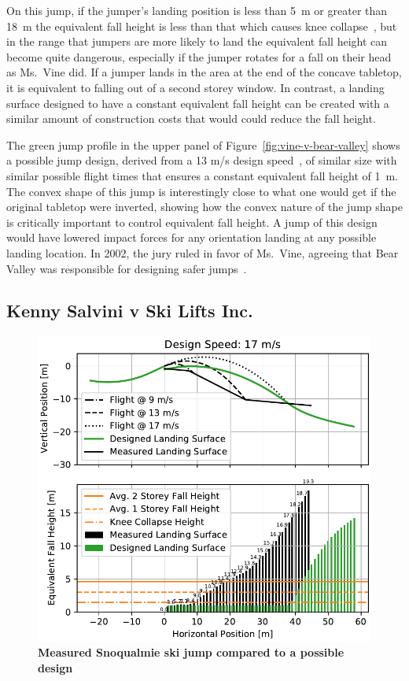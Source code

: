 \documentclass{article}
\begin{document}
On this jump, if the jumper's landing position is less than 5~\si{\meter} or
greater than 18~\si{\meter} the equivalent fall height is less than that which
causes knee collapse~\cite{Minetti1998}, but in the range that jumpers are more
likely to land the equivalent fall height can become quite dangerous,
especially if the jumper rotates for a fall on their head as Ms.~Vine did. If a
jumper lands in the area at the end of the concave tabletop, it is equivalent
to falling out of a second storey window. In contrast, a landing surface
designed to have a constant equivalent fall height can be created with a
similar amount of construction costs that would could reduce the fall height.

The green jump profile in the upper panel of
Figure~\ref{fig:vine-v-bear-valley} shows a possible jump design, derived from
a 13 m/s design speed~\cite{Levy2015}, of similar size with similar possible
flight times that ensures a constant equivalent fall height of 1~\si{\meter}.
The convex shape of this jump is interestingly close to what one would get if
the original tabletop were inverted, showing how the convex nature of the jump
shape is critically important to control equivalent fall height. A jump of this
design would have lowered impact forces for any orientation landing at any
possible landing location. In 2002, the jury ruled in favor of Ms.~Vine,
agreeing that Bear Valley was responsible for designing safer
jumps~\cite{Alvarado2002}.

\subsection{Kenny Salvini v Ski Lifts Inc.}
%
\begin{figure}
  \centering
  \includegraphics[width=5.25in]{figures/salvini-v-snoqualmie.pdf}
  \caption{\textbf{Measured Snoqualmie ski jump compared to a possible design}}
  \label{fig:salvini-v-snoqualmie}
\end{figure}
\end{document}
